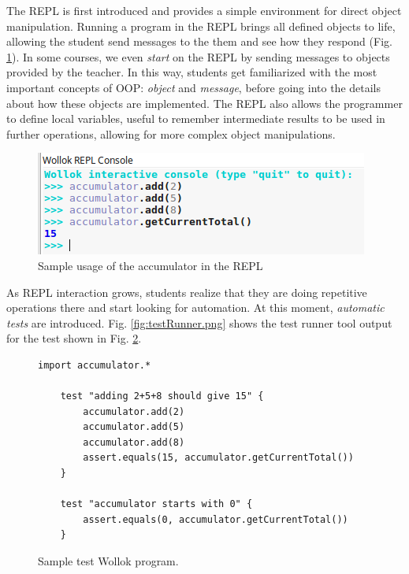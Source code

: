 The REPL is first introduced and provides a simple environment for direct object manipulation.
Running a program in the REPL brings all defined objects to life,
allowing the student send messages to the them and see how they respond (\cf Fig. \ref{fig:repl}).
In some courses, we even \emph{start} on the REPL by sending messages to objects provided by the teacher.
In this way, students get familiarized with the most important concepts of OOP: \emph{object} and \emph{message}, 
before going into the details about how these objects are implemented.
The REPL also allows the programmer to define local variables, 
useful to remember intermediate results to be used in further operations, 
allowing for more complex object manipulations.

\begin{figure}[ht]
\vspace{-2mm}
 \centering
 \includegraphics[scale=0.55]{images/accumulator-repl.png}
\vspace{-3mm}
\caption{Sample usage of the accumulator in the REPL}
\label{fig:repl}
\vspace{-4mm}
\end{figure}

As REPL interaction grows, students realize that they are doing repetitive operations there 
and start looking for automation.
At this moment, \emph{automatic tests} are introduced.
Fig. \ref{fig:testRunner.png} shows the test runner tool output for the test shown in Fig. \ref{fig:test}.

\begin{figure}[ht]
\vspace{-3mm}
\centering
\begin{lstlisting}[language=Wollok]
 	import accumulator.*

	test "adding 2+5+8 should give 15" {
		accumulator.add(2)
		accumulator.add(5)
		accumulator.add(8)
		assert.equals(15, accumulator.getCurrentTotal())		
	}
   
	test "accumulator starts with 0" {
		assert.equals(0, accumulator.getCurrentTotal())
	}\end{lstlisting}
\vspace{-5mm}
\caption{Sample test Wollok program.}
\label{fig:test}
\end{figure}


